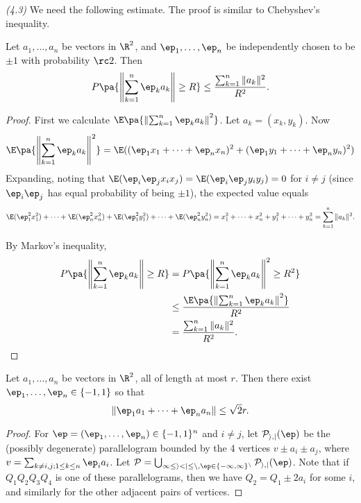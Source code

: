 \begin{problem} {\it (4.3)}
We need the following estimate. The proof is similar to Chebyshev's inequality.
\begin{lem}\label{p3-7-l1}
Let $a_1,\ldots, a_n$ be vectors in $\R^2$, and $\ep_1,\ldots, \ep_n$ be independently chosen to be $\pm 1$ with probability $\rc2$. Then
\[
P\pa{\left\Vert\sum_{k=1}^n \ep_ka_k\right\Vert\ge R}\le\frac{\sum_{k=1}^n \Vert a_k\Vert^2}{R^2}. 
\]
\end{lem}
\begin{proof}
First we calculate $\E\pa{\left\Vert\sum_{k=1}^n \ep_ka_k\right\Vert^2}$. Let $a_k=(x_k,y_k)$. Now
\[
\E\pa{\left\Vert\sum_{k=1}^n \ep_ka_k\right\Vert^2} =\E((\ep_1x_1+\cdots +\ep_nx_n)^2+(\ep_1y_1+\cdots +\ep_ny_n)^2)\]
Expanding, noting that $\E(\ep_i\ep_jx_ix_j)=\E(\ep_i\ep_jy_iy_j)=0$ for $i\ne j$ (since $\ep_i\ep_j$ has equal probability of being $\pm1$), the expected value equals
\[
\E(\ep_1^2x_1^2)+\cdots +\E(\ep_n^2 x_n^2)+\E(\ep_1^2 y_1^2)+\cdots +\E(\ep_n^2y_n^2)=x_1^2+\cdots +x_n^2+y_1^2+\cdots +y_n^2=\sum_{k=1}^n \Vert a_k\Vert^2.
\]

By Markov's inequality,
\begin{align*}P\pa{\left\Vert\sum_{k=1}^n \ep_ka_k\right\Vert\ge R}&=
P\pa{\left\Vert\sum_{k=1}^n \ep_ka_k\right\Vert^2\ge R^2}\\
&\le \frac{\E\pa{\left\Vert\sum_{k=1}^n \ep_ka_k\right\Vert^2}}{R^2}\\
&=\frac{\sum_{k=1}^n \Vert a_k\Vert^2}{R^2}.
\end{align*}
\end{proof}
\begin{lem}\label{p3-7-l2}
Let $a_1,\ldots, a_n$ be vectors in $\R^2$, all of length at most $r$. Then there exist $\ep_1,\ldots, \ep_n\in \{-1,1\}$ so that
\[
\Vert\ep_1a_1+\cdots +\ep_na_n\Vert\le \sqrt 2r.
\]
\end{lem}
\begin{proof}
For $\ep=(\ep_1,\ldots, \ep_n)\in \{-1,1\}^n$ and $i\neq j$, let $\cal P_{i,j}(%
\ep)$ be the (possibly degenerate) parallelogram bounded by the 4 vertices $v\pm a_i\pm a_j$, where $v=\sum_{k\neq i,j; 1\le k\le n} \ep_ia_i$. Let $\cal P=\bigcup_{1\le i<j\le n, \ep\in \{-1,1\}^n} \cal P_{i,j}(\ep)$. Note that if $Q_1Q_2Q_3Q_4$ is one of these parallelograms, then we have $Q_2=Q_1\pm 2a_i$ for some $i$, and similarly for the other adjacent pairs of vertices.


\end{proof}
\end{problem}
